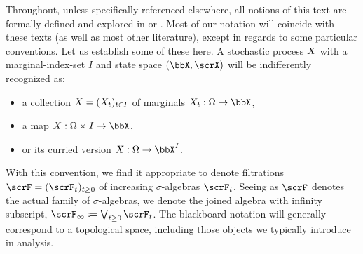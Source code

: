Throughout, unless specifically referenced elsewhere, all notions of this text are formally defined and explored in \cite{Kallenberg2002} or \cite{jacod2003}.
Most of our notation will coincide with these texts (as well as most other literature), except in regards to some particular conventions.
Let us establish some of these here.
A stochastic process $X$ with a marginal-index-set $I$ and state space $(\stateSpace, \stateAlg)$ will be indifferently recognized as:
\begin{itemize}
  \item
    a collection $X=(X_t)_{t\in I}$ of marginals $\X_t: \Omega \rightarrow \stateSpace$,
  \item
    a map $\X: \Omega \times I \rightarrow \stateSpace$, 
  \item
    or its curried version $\X: \Omega \rightarrow \stateSpace^I$.
\end{itemize}
With this convention, we find it appropriate to denote filtrations $\scrF=(\scrF_t)_{t\geq0}$ of increasing $\sigma$-algebras $\scrF_t$.
Seeing as $\scrF$ denotes the actual family of $\sigma$-algebras, we denote the joined algebra with infinity subscript, $\scrF_\infty \defeq \bigvee_{t\geq0} \scrF_t$.
The blackboard notation will generally correspond to a topological space, including those objects we typically introduce in analysis.
